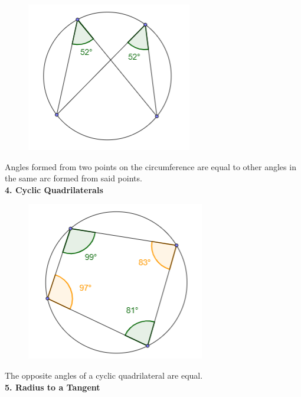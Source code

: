         \begin{figure} [hbt!]
            \centering
            \includegraphics[scale=0.7]{Resources/Unit4Circles/circle3.PNG}
        \end{figure}

        \noindent Angles formed from two points on the circumference are equal to other angles
        in the same arc formed from said points. \\

        \noindent \color{purple} \textbf{4. Cyclic Quadrilaterals} \color{black} \\

        \begin{figure} [hbt!]
            \centering
            \includegraphics[scale=0.6]{Resources/Unit4Circles/circle4.PNG}
        \end{figure}

        \noindent The opposite angles of a cyclic quadrilateral are equal. \\

        \noindent \color{purple}\textbf{5. Radius to a Tangent} \color{black} \\

